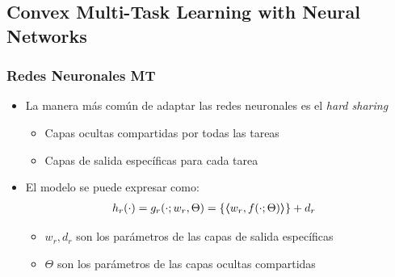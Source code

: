 \documentclass{beamer}
\newcommand{\dotp}[2]{\bm{\left\langle} #1, #2 \bm{\right\rangle}}
\begin{document}
\subsection{Convex Multi-Task Learning with Neural Networks}
\begin{frame}
      \frametitle{Redes Neuronales MT}

      \begin{itemize}
            \item La manera más común de adaptar las redes neuronales es el \emph{hard sharing}
            \begin{itemize}
                  \item Capas ocultas compartidas por todas las tareas
                  \item Capas de salida específicas para cada tarea
            \end{itemize}
            \item El modelo se puede expresar como:
            \begin{equation}
                  \nonumber
                  \begin{aligned}
                      h_r(\cdot) &=  g_r(\cdot; w_r, \Theta)
                     =  \lbrace \dotp{w_r}{f(\cdot; \Theta)} \rbrace + d_r
                  \end{aligned}
            \end{equation}
            \begin{itemize}
                  \item $w_r, d_r$ son los parámetros de las capas de salida específicas
                  \item $\Theta$ son los parámetros de las capas ocultas compartidas
            \end{itemize}
      \end{itemize}

\end{frame}

\begin{frame}

      

\end{frame}
\end{document}
